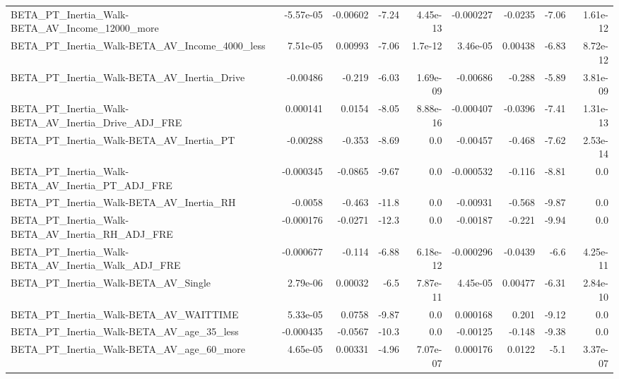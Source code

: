 \begin{tabular}{lrrrrrrrr}
BETA\_PT\_Inertia\_Walk-BETA\_AV\_Income\_12000\_more     &   -5.57e-05 &     -0.00602 &    -7.24 & 4.45e-13 &  -0.000227 &     -0.0235 &        -7.06 &      1.61e-12 \\
BETA\_PT\_Inertia\_Walk-BETA\_AV\_Income\_4000\_less      &    7.51e-05 &      0.00993 &    -7.06 &  1.7e-12 &   3.46e-05 &     0.00438 &        -6.83 &      8.72e-12 \\
BETA\_PT\_Inertia\_Walk-BETA\_AV\_Inertia\_Drive         &    -0.00486 &       -0.219 &    -6.03 & 1.69e-09 &   -0.00686 &      -0.288 &        -5.89 &      3.81e-09 \\
BETA\_PT\_Inertia\_Walk-BETA\_AV\_Inertia\_Drive\_ADJ\_FRE &    0.000141 &       0.0154 &    -8.05 & 8.88e-16 &  -0.000407 &     -0.0396 &        -7.41 &      1.31e-13 \\
BETA\_PT\_Inertia\_Walk-BETA\_AV\_Inertia\_PT            &    -0.00288 &       -0.353 &    -8.69 &      0.0 &   -0.00457 &      -0.468 &        -7.62 &      2.53e-14 \\
BETA\_PT\_Inertia\_Walk-BETA\_AV\_Inertia\_PT\_ADJ\_FRE    &   -0.000345 &      -0.0865 &    -9.67 &      0.0 &  -0.000532 &      -0.116 &        -8.81 &           0.0 \\
BETA\_PT\_Inertia\_Walk-BETA\_AV\_Inertia\_RH            &     -0.0058 &       -0.463 &    -11.8 &      0.0 &   -0.00931 &      -0.568 &        -9.87 &           0.0 \\
BETA\_PT\_Inertia\_Walk-BETA\_AV\_Inertia\_RH\_ADJ\_FRE    &   -0.000176 &      -0.0271 &    -12.3 &      0.0 &   -0.00187 &      -0.221 &        -9.94 &           0.0 \\
BETA\_PT\_Inertia\_Walk-BETA\_AV\_Inertia\_Walk\_ADJ\_FRE  &   -0.000677 &       -0.114 &    -6.88 & 6.18e-12 &  -0.000296 &     -0.0439 &         -6.6 &      4.25e-11 \\
BETA\_PT\_Inertia\_Walk-BETA\_AV\_Single                &    2.79e-06 &      0.00032 &     -6.5 & 7.87e-11 &   4.45e-05 &     0.00477 &        -6.31 &      2.84e-10 \\
BETA\_PT\_Inertia\_Walk-BETA\_AV\_WAITTIME              &    5.33e-05 &       0.0758 &    -9.87 &      0.0 &   0.000168 &       0.201 &        -9.12 &           0.0 \\
BETA\_PT\_Inertia\_Walk-BETA\_AV\_age\_35\_less           &   -0.000435 &      -0.0567 &    -10.3 &      0.0 &   -0.00125 &      -0.148 &        -9.38 &           0.0 \\
BETA\_PT\_Inertia\_Walk-BETA\_AV\_age\_60\_more           &    4.65e-05 &      0.00331 &    -4.96 & 7.07e-07 &   0.000176 &      0.0122 &         -5.1 &      3.37e-07 \\

\end{tabular}
